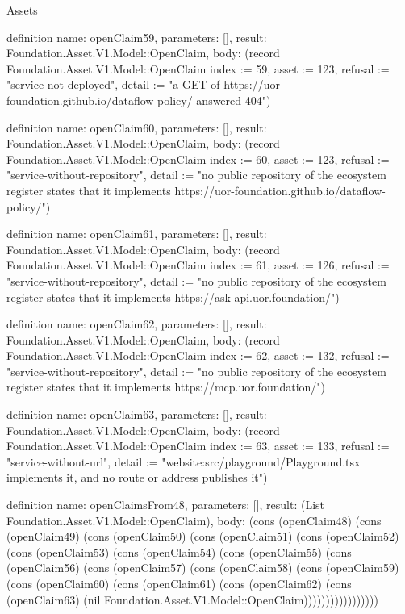 \begin{lexlean}{Assets}
\begin{semanticmodule}
definition{
  name: openClaim59,
  parameters: [],
  result: Foundation.Asset.V1.Model::OpenClaim,
  body: (record Foundation.Asset.V1.Model::OpenClaim {index := 59, asset := 123, refusal := "service-not-deployed", detail := "a GET of https://uor-foundation.github.io/dataflow-policy/ answered 404"})
}

definition{
  name: openClaim60,
  parameters: [],
  result: Foundation.Asset.V1.Model::OpenClaim,
  body: (record Foundation.Asset.V1.Model::OpenClaim {index := 60, asset := 123, refusal := "service-without-repository", detail := "no public repository of the ecosystem register states that it implements https://uor-foundation.github.io/dataflow-policy/"})
}

definition{
  name: openClaim61,
  parameters: [],
  result: Foundation.Asset.V1.Model::OpenClaim,
  body: (record Foundation.Asset.V1.Model::OpenClaim {index := 61, asset := 126, refusal := "service-without-repository", detail := "no public repository of the ecosystem register states that it implements https://ask-api.uor.foundation/"})
}

definition{
  name: openClaim62,
  parameters: [],
  result: Foundation.Asset.V1.Model::OpenClaim,
  body: (record Foundation.Asset.V1.Model::OpenClaim {index := 62, asset := 132, refusal := "service-without-repository", detail := "no public repository of the ecosystem register states that it implements https://mcp.uor.foundation/"})
}

definition{
  name: openClaim63,
  parameters: [],
  result: Foundation.Asset.V1.Model::OpenClaim,
  body: (record Foundation.Asset.V1.Model::OpenClaim {index := 63, asset := 133, refusal := "service-without-url", detail := "website:src/playground/Playground.tsx implements it, and no route or address publishes it"})
}

definition{
  name: openClaimsFrom48,
  parameters: [],
  result: (List Foundation.Asset.V1.Model::OpenClaim),
  body: (cons (openClaim48) (cons (openClaim49) (cons (openClaim50) (cons (openClaim51) (cons (openClaim52) (cons (openClaim53) (cons (openClaim54) (cons (openClaim55) (cons (openClaim56) (cons (openClaim57) (cons (openClaim58) (cons (openClaim59) (cons (openClaim60) (cons (openClaim61) (cons (openClaim62) (cons (openClaim63) (nil Foundation.Asset.V1.Model::OpenClaim)))))))))))))))))
}


\end{semanticmodule}
\end{lexlean}
